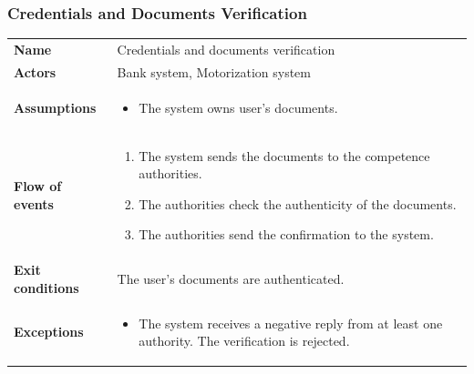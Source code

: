\documentclass[english]{article}
\begin{document}
		\subsubsection{Credentials and Documents Verification}
		\begin{center}
		\begin{tabular}{l||p{10cm}}
		\textbf{Name} 
			& Credentials and documents verification\\ [8px]
		\textbf{Actors} 
			& Bank system, Motorization system\\ [8px]
		\textbf{Assumptions} 
			& \begin{itemize}
				\item The system owns user's documents.
			\end{itemize}\\
		\textbf{Flow of events}
			& \begin{enumerate}
	 			\item The system sends the documents to the competence authorities.
				\item The authorities check the authenticity of the documents.
				\item The authorities send the confirmation to the system.
			\end{enumerate}\\ 
		\textbf{Exit conditions}
			& The user's documents are authenticated.\\ [8px]
		\textbf{Exceptions}
			& \begin{itemize}
				\item The system receives a negative reply from at least one authority. The verification is rejected.
			\end{itemize}
		\end{tabular}
		\end{center}
		\noindent
\end{document}
